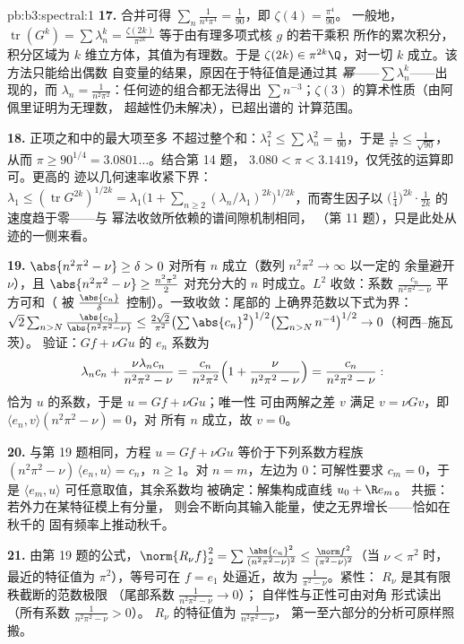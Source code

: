 \begin{solution}{pb:b3:spectral:1}
\textbf{17.} 合并可得 $\sum_n\frac1{n^4\pi^4} =
\frac1{90}$，即 $\zeta(4) = \frac{\pi^4}{90}$。
一般地，$\operatorname{tr}(G^k) = \sum\lambda_n^k =
\frac{\zeta(2k)}{\pi^{2k}}$ 等于由有理多项式核 $g$ 的若干乘积
所作的累次积分，积分区域为
$k$ 维立方体，其值为有理数。于是 $\zeta(2k) \in
\pi^{2k}\Q$，对一切 $k$ 成立。该方法只能给出偶数
自变量的结果，原因在于特征值是通过其
\emph{幂}——$\sum\lambda_n^k$——出现的，而 $\lambda_n =
\frac1{n^2\pi^2}$：任何迹的组合都无法得出 $\sum
n^{-3}$；$\zeta(3)$ 的算术性质（由阿佩里证明为无理数，
超越性仍未解决），已超出谱的
计算范围。

\textbf{18.} 正项之和中的最大项至多
不超过整个和：$\lambda_1^2 \leq \sum\lambda_n^2 =
\frac1{90}$，于是 $\frac1{\pi^2} \leq \frac1{\sqrt{90}}$，从而
$\pi \geq 90^{1/4} = 3.0801\ldots$。结合第 14 题，
$3.080 < \pi < 3.1419$，仅凭弦的运算即可。更高的
迹以几何速率收紧下界：
$\lambda_1 \leq (\operatorname{tr}G^{2k})^{1/2k} =
\lambda_1\bigl(1 + \sum_{n\geq2}(\lambda_n/\lambda_1)^{2k}
\bigr)^{1/2k}$，而寄生因子以
$\bigl(\tfrac14\bigr)^{2k}\cdot\frac1{2k}$ 的速度趋于零——与
幂法收敛所依赖的谱间隙机制相同，
（第 11 题），只是此处从迹的一侧来看。

\textbf{19.} $\abs{n^2\pi^2 - \nu} \geq \delta > 0$ 对所有
$n$ 成立（数列 $n^2\pi^2 \to \infty$ 以一定的
余量避开 $\nu$），且 $\abs{n^2\pi^2 - \nu} \geq \frac{n^2\pi^2}2$
对充分大的 $n$ 时成立。$L^2$ 收敛：系数
$\frac{c_n}{n^2\pi^2 - \nu}$ 平方可和（
被 $\frac{\abs{c_n}}\delta$ 控制）。一致收敛：尾部的
上确界范数以下式为界：$\sqrt2\sum_{n>N}
\frac{\abs{c_n}}{\abs{n^2\pi^2 - \nu}} \leq
\frac{2\sqrt2}{\pi^2}\bigl(\sum\abs{c_n}^2\bigr)^{1/2}
\bigl(\sum_{n>N}n^{-4}\bigr)^{1/2} \to 0$（柯西–施瓦茨）。
验证：$Gf + \nu Gu$ 的 $e_n$ 系数为
\[
\lambda_nc_n + \frac{\nu\lambda_nc_n}{n^2\pi^2 - \nu}
= \frac{c_n}{n^2\pi^2}\Bigl(1 + \frac{\nu}{n^2\pi^2 -
\nu}\Bigr) = \frac{c_n}{n^2\pi^2 - \nu} :
\]
恰为
$u$ 的系数，于是 $u = Gf + \nu Gu$；唯一性
可由两解之差 $v$ 满足 $v = \nu
Gv$，即 $\langle e_n, v\rangle(n^2\pi^2 - \nu) = 0$，对
所有 $n$ 成立，故 $v = 0$。

\textbf{20.} 与第 19 题相同，方程 $u = Gf + \nu
Gu$ 等价于下列系数方程族
$(n^2\pi^2 - \nu)\,\langle e_n, u\rangle = c_n$，$n \geq
1$。对 $n = m$，左边为
$0$：可解性要求 $c_m = 0$，于是 $\langle e_m,
u\rangle$ 可任意取值，其余系数均
被确定：解集构成直线 $u_0 + \R e_m$。
共振：若外力在某特征模上有分量，
则会不断向其输入能量，使之无界增长——恰如在秋千的
固有频率上推动秋千。

\textbf{21.} 由第 19 题的公式，$\norm{R_\nu f}_2^2
= \sum\frac{\abs{c_n}^2}{(n^2\pi^2 - \nu)^2} \leq
\frac{\norm f^2}{(\pi^2 - \nu)^2}$（当 $\nu < \pi^2$ 时，
最近的特征值为 $\pi^2$），等号可在
$f = e_1$ 处逼近，故为 $\frac1{\pi^2 - \nu}$。紧性：
$R_\nu$ 是其有限秩截断的范数极限
（尾部系数 $\frac1{n^2\pi^2 - \nu} \to 0$）；
自伴性与正性可由对角
形式读出（所有系数 $\frac1{n^2\pi^2 - \nu} > 0$）。
$R_\nu$ 的特征值为 $\frac1{n^2\pi^2 - \nu}$，
第一至六部分的分析可原样照搬。


\end{solution}
